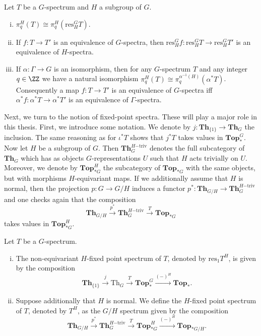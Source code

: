 \begin{lem}
Let $T$ be a $G$-spectrum and $H$ a subgroup of $G$.
\begin{enumerate}[(i)]
\item $\pi_q^H(T)\cong \pi_q^H(\mathrm{res}^G_H T)$.
\item If $f:T\to T'$ is an equivalence of $G$-spectra, then $\mathrm{res}^G_H f:
\mathrm{res}^G_HT\to \mathrm{res}^G_H T'$ is an equivalence of
$H$-spectra.
\item If $\alpha:\Gamma\to G$ is an isomorphism, then for any $G$-spectrum $T$
and any integer $q\in \ZZ$
we have a natural isomorphism $\pi_q^H(T)\cong \pi_q^{\alpha^{-1}(H)}(\alpha^\ast T)$.
Consequently a map $f:T\to T'$ is an equivalence of $G$-spectra iff
$\alpha^\ast f:\alpha^\ast T\to \alpha^\ast T'$ is an equivalence of $\Gamma$-spectra.
\end{enumerate}
\end{lem}


Next, we turn to the notion of fixed-point spectra. These will play a major role in this thesis. 
First, we introduce some notation. We denote by
$j:\mathbf{Th}_{\{1\}}\to \mathbf{Th}_G$ the inclusion.
The same reasoning as for 
$\iota^\ast T$ shows that $j^\ast T$ takes values in $\mathbf{Top}_\ast^G $.
Now let $H$ be a subgroup of $G$.
Then $\mathbf{Th}_G^{H\mathrm{-triv}}$ denotes the full
subcategory of $\mathbf{Th}_G$ which has as objects
$G$-representations $U$ such that $H$ acts trivially on $U$.
Moreover, we denote by $\mathbf{Top}_{\ast G}^H$ the subcategory
of $\mathbf{Top}_{\ast G}$ with the same objects, but with morphisms
$H$-equivariant maps. If we additionally assume that $H$ is normal,
then the projection $p:G\to G/H$ induces a functor
$p^\ast:\mathbf{Th}_{G/H}\to\mathbf{Th}_G^{H\mathrm{-triv}}$
and one checks again that the composition
\[
\mathbf{Th}_{G/H}\xrightarrow{p^\ast}\mathbf{Th}_G^{H\mathrm{-triv}}
\xrightarrow{T} \mathbf{Top}_{\ast G}
\]
takes values in $\mathbf{Top}_{\ast G}^H$.
\begin{mydef}
Let $T$ be a $G$-spectrum.
\begin{enumerate}[(i)]
\item The non-equivariant $H$-fixed point spectrum of $T$, denoted
by $\mathrm{res}_1 T^H$, is given by the composition
\[
\mathbf{Th}_{\{1\}}\xrightarrow{j}\mathrm{Th}_G \xrightarrow{T}
\mathbf{Top}_\ast^G \xrightarrow{(-)^H} \mathbf{Top}_\ast.
\]
\item Suppose additionally that $H$ is normal. We define the $H$-fixed
point spectrum of $T$, denoted by $T^H$, as the $G/H$ spectrum
given by the composition
\[
\mathbf{Th}_{G/H}\xrightarrow{p^\ast}\mathbf{Th}_G^{H\mathrm{-triv}}
\xrightarrow{T} \mathbf{Top}_{\ast G}^H\xrightarrow{(-)^H} \mathbf{Top}_{\ast G/H}.
\]
\end{enumerate}
\end{mydef}

